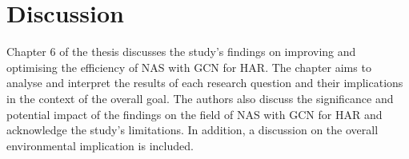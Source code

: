 \chapter{Discussion}\label{discussion}
\begin{comment}
This chapter aims to analyse and interpret the findings of our study in the context of the overall goal and research questions. Our research aimed to improve and optimise the efficiency of neural architecture search (NAS) with graph convolutional networks (GCN) for human action recognition (HAR). The authors will first interpret the results of each research question and discuss their implications in the context of the overall goal. We will then consider the significance of our findings and their potential impact on the field of NAS with GCN for HAR. Furthermore, we will acknowledge the limitations of our study. 
\end{comment}
Chapter 6 of the thesis discusses the study's findings on improving and optimising the efficiency of NAS with GCN for HAR. The chapter aims to analyse and interpret the results of each research question and their implications in the context of the overall goal. The authors also discuss the significance and potential impact of the findings on the field of NAS with GCN for HAR and acknowledge the study's limitations. In addition, a discussion on the overall environmental implication is included. 

\begin{comment}
    In this chapter, the method and experimental result are analysed and discussed regarding
their merits and limitations in light of research from the literature. The chapter is
concluded with a discussion of how the research questions are answered.
\end{comment}

%


